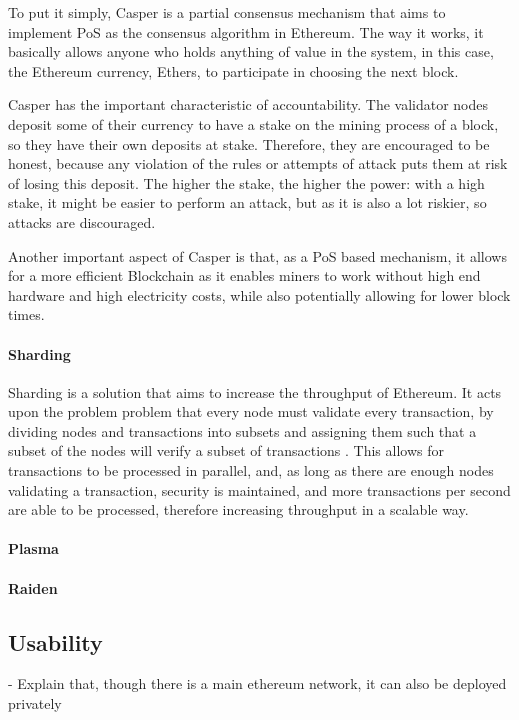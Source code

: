 To put it simply, Casper is a partial consensus mechanism that aims to implement PoS as the consensus algorithm in Ethereum. The way it works, it basically allows anyone who holds anything of value in the system, in this case, the Ethereum currency, Ethers, to participate in choosing the next block.

Casper has the important characteristic of accountability. The validator nodes deposit some of their currency to have a stake on the mining process of a block, so they have their own deposits at stake. Therefore, they are encouraged to be honest, because any violation of the rules or attempts of attack puts them at risk of losing this deposit. The higher the stake, the higher the power: with a high stake, it might be easier to perform an attack, but as it is also a lot riskier, so attacks are discouraged.

Another important aspect of Casper is that, as a PoS based mechanism, it allows for a more efficient Blockchain as it enables miners to work without high end hardware and high electricity costs, while also potentially allowing for lower block times.

\paragraph{Sharding}

Sharding is a solution that aims to increase the throughput of Ethereum. It acts upon the problem problem that every node must validate every transaction, by dividing nodes and transactions into subsets and assigning them such that a subset of the nodes will verify a subset of transactions \cite{ButerinSharding}. This allows for transactions to be processed in parallel, and, as long as there are enough nodes validating a transaction, security is maintained, and more transactions per second are able to be processed, therefore increasing throughput in a scalable way.

\paragraph{Plasma}

\paragraph{Raiden}

\break

\iffalse
\subsection{Usability}
- Explain that, though there is a main ethereum network, it can also be deployed privately

